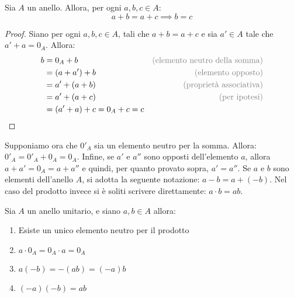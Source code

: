 \begin{propbox}	
	Sia $A$ un anello. Allora, per ogni $a,b,c \in A$:
	\begin{equation}
		a+b = a+c  \implies b=c
	\end{equation}
\end{propbox}
\begin{proof}
	Siano per ogni $a,b,c \in A$, tali che $a+b=a+c$ e sia $a'\in A$ tale che $a'+a=0_{A}$. Allora:
	\begin{align*}
		b &= 0_{A}+b  & \text{\textcolor{gray}{(elemento neutro della somma)}}\\
		&= (a+a')+b & \text{\textcolor{gray}{(elemento opposto)}}\\
		&= a' + (a+b) & \text{\textcolor{gray}{(proprietà associativa)}}\\
		&=a' + (a+c) & \text{\textcolor{gray}{(per ipotesi)}} \\
		&=(a'+a)+c  =0_{A}+c =c \\
	\end{align*}
\end{proof}

Supponiamo ora che $0'_{A}$ sia un elemento neutro per la somma. Allora:
$	0'_{A} = 0'_{A}+0_{A}=0_{A}$. Infine, se $a'$ e $a''$ sono opposti dell'elemento $a$, allora $a+a'=0_{A}=a+a''$ e quindi, per quanto provato sopra, $a'=a''$. Se $a$ e $b$ sono elementi dell'anello $A$, si adotta la seguente notazione: $a-b=a+(-b)$. Nel caso del prodotto invece si è soliti scrivere direttamente: $a \cdot b = ab$.


\begin{propbox}
	Sia $A$ un anello unitario, e siano $a,b \in A$ allora:
	\begin{enumerate}
		\item Esiste un unico elemento neutro per il prodotto
		\item $a \cdot 0_{A}=0_{A} \cdot a=0_{A}$
		\item $a(-b)=-(ab)=(-a)b$
		\item $(-a)(-b)=ab$
	\end{enumerate}
\end{propbox}

